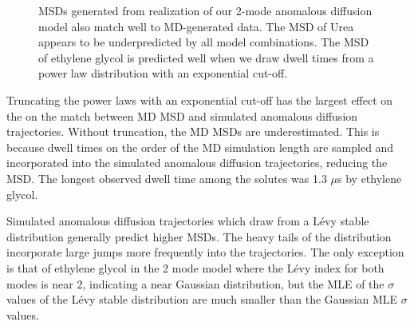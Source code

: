 \documentclass{article}
\begin{document}
\begin{figure}
  \caption{MSDs generated from realization of our 2-mode anomalous diffusion model
  also match well to MD-generated data. The MSD of Urea appears to be underpredicted
  by all model combinations. The MSD of ethylene glycol is predicted well when 
  we draw dwell times from a power law distribution with an exponential cut-off.}\label{fig:anomalous_msds_2mode}
  \end{figure}
  
  Truncating the power laws with an exponential cut-off has the largest effect on the on 
  the match between MD MSD and simulated anomalous diffusion trajectories. Without 
  truncation, the MD MSDs are underestimated. This is because dwell times on the order 
  of the MD simulation length are sampled and incorporated into the simulated anomalous
  diffusion trajectories, reducing the MSD. The longest observed dwell time among the
  solutes was 1.3 $\mu$s by ethylene glycol.
  
  Simulated anomalous diffusion trajectories which draw from a L\'evy stable distribution
  generally predict higher MSDs. The heavy tails of the distribution incorporate large
  jumps more frequently into the trajectories. The only exception is that of ethylene
  glycol in the 2 mode model where the L\'evy index for both modes is near 2, indicating
  a near Gaussian distribution, but the MLE of the $\sigma$ values of the L\'evy stable
  distribution are much smaller than the Gaussian MLE $\sigma$ values.
    
\end{document}
